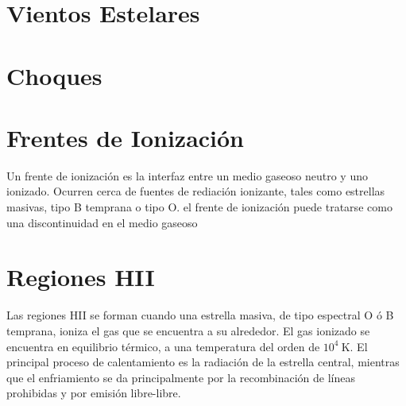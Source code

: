 \section{Vientos Estelares}
\section{Choques}
\section{Frentes de Ionización}
Un frente de ionización es la interfaz entre un medio gaseoso neutro y uno
ionizado. Ocurren cerca de fuentes de rediación ionizante, tales como
estrellas masivas, tipo B temprana o tipo O. el frente de ionización puede
tratarse como una discontinuidad en el medio gaseoso

\section{Regiones HII}
Las regiones HII se forman cuando una estrella masiva, de tipo espectral
O ó B temprana, ioniza el gas que se encuentra a su alrededor. El gas
ionizado se encuentra en equilibrio térmico, a una temperatura del
orden de $10^4~\mathrm{K}$. El principal proceso de calentamiento es la
radiación de la estrella central, mientras que el enfriamiento se da
principalmente por la recombinación de líneas prohibidas y por emisión
libre-libre.

